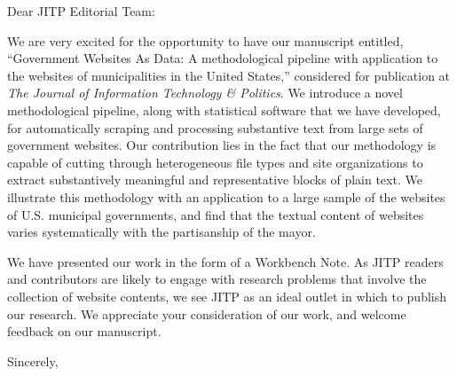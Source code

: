 \documentclass[a4paper]{letter}
\begin{document}
 
\begin{letter} 


 

 
\opening{Dear JITP Editorial Team:}
\medskip 


We are very excited for the opportunity to have our manuscript entitled, ``Government Websites As Data:  A methodological pipeline with application to the websites of municipalities in the United States,'' considered for publication at {\em The Journal of Information Technology \& Politics}.  We introduce a novel methodological pipeline, along with statistical software that we have developed, for automatically scraping and processing substantive text from large sets of government websites. Our contribution lies in the fact that our methodology is capable of cutting through heterogeneous file types and site organizations to extract substantively meaningful and representative blocks of plain text. We illustrate this methodology with an application to a large sample of the websites of U.S. municipal governments, and find that the textual content of websites varies systematically with the partisanship of the mayor.

We have presented our work in the form of a Workbench Note. As JITP readers and contributors are likely to engage with research problems that involve the collection of website contents, we see JITP as an ideal outlet in which to publish our research. We appreciate your consideration of our work, and welcome feedback on our manuscript.

\closing{Sincerely,} 

\end{letter} 
\end{document}
